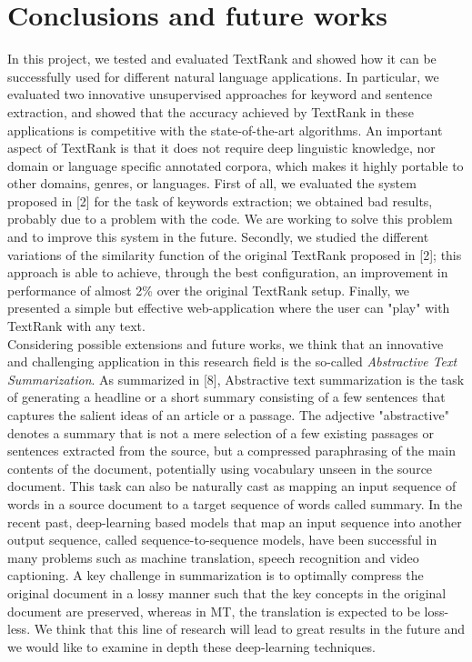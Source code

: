 \documentclass[twoside,twocolumn]{article}
\begin{document}
\section{Conclusions and future works} 
In this project, we tested and evaluated TextRank and showed how it can be successfully used for different natural language applications. In particular, we evaluated two innovative unsupervised approaches for keyword and sentence extraction, and showed that the accuracy achieved by TextRank in these applications is competitive with the state-of-the-art algorithms. An important aspect of TextRank is that it does not require deep linguistic knowledge, nor domain or language specific annotated corpora, which makes it highly portable to other domains, genres, or languages. First of all, we evaluated the system proposed in [2] for the task of keywords extraction; we obtained bad results, probably due to a problem with the code. We are working to solve this problem and to improve this system in the future. Secondly, we studied the different variations of the similarity function of the original TextRank proposed in [2]; this approach is able to achieve, through the best configuration, an improvement in performance of almost 2\% over the original TextRank setup. Finally, we presented a simple but effective web-application where the user can "play" with TextRank with any text.\\
Considering possible extensions and future works, we think that an innovative and challenging application in this research field is the so-called \textit{Abstractive Text Summarization}. As summarized in [8], Abstractive text summarization is the task of generating a headline or a short summary consisting of a few sentences that captures the salient ideas of an article or a passage. The adjective "abstractive" denotes a summary that is not a mere selection of a few existing passages or sentences extracted from the source, but a compressed paraphrasing of the main contents of the document, potentially using vocabulary unseen in the source document. This task can also be naturally cast as mapping an input sequence of words in a source document to a target sequence of words called summary. In the recent past, deep-learning based models that map an input sequence into another output sequence, called sequence-to-sequence models, have been successful in many problems such as machine translation, speech recognition and video captioning.  A key challenge in summarization is to optimally compress the original document in a lossy manner such that the key concepts in the original document are preserved, whereas in MT, the translation is expected to be loss-less. We think that this line of research will lead to great results in the future and we would like to examine in depth these deep-learning techniques. 
\end{document}

